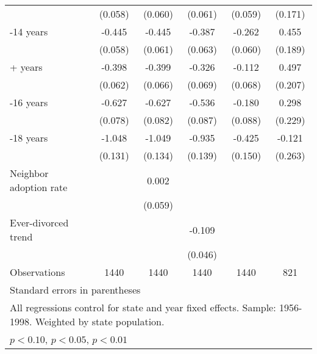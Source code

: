 \begin{table}[htbp]
\begin{tabular}{l*{5}{c}}
                    &     (0.058)         &     (0.060)         &     (0.061)         &     (0.059)         &     (0.171)         \\
\addlinespace
13-14 years         &      -0.445\sym{***}&      -0.445\sym{***}&      -0.387\sym{***}&      -0.262\sym{***}&       0.455\sym{**} \\
                    &     (0.058)         &     (0.061)         &     (0.063)         &     (0.060)         &     (0.189)         \\
\addlinespace
15+ years           &      -0.398\sym{***}&      -0.399\sym{***}&      -0.326\sym{***}&      -0.112\sym{*}  &       0.497\sym{**} \\
                    &     (0.062)         &     (0.066)         &     (0.069)         &     (0.068)         &     (0.207)         \\
\addlinespace
15-16 years         &      -0.627\sym{***}&      -0.627\sym{***}&      -0.536\sym{***}&      -0.180\sym{**} &       0.298         \\
                    &     (0.078)         &     (0.082)         &     (0.087)         &     (0.088)         &     (0.229)         \\
\addlinespace
17-18 years         &      -1.048\sym{***}&      -1.049\sym{***}&      -0.935\sym{***}&      -0.425\sym{***}&      -0.121         \\
                    &     (0.131)         &     (0.134)         &     (0.139)         &     (0.150)         &     (0.263)         \\
\addlinespace
Neighbor adoption rate&                     &       0.002         &                     &                     &                     \\
                    &                     &     (0.059)         &                     &                     &                     \\
\addlinespace
Ever-divorced trend &                     &                     &      -0.109\sym{**} &                     &                     \\
                    &                     &                     &     (0.046)         &                     &                     \\
\midrule
Observations        &        1440         &        1440         &        1440         &        1440         &         821         \\
\bottomrule
\multicolumn{6}{l}{\footnotesize Standard errors in parentheses}\\
\multicolumn{6}{l}{\footnotesize All regressions control for state and year fixed effects. Sample: 1956-1998. Weighted by state population.}\\
\multicolumn{6}{l}{\footnotesize \sym{*} \(p<0.10\), \sym{**} \(p<0.05\), \sym{***} \(p<0.01\)}\\
\end{tabular}
\end{table}
